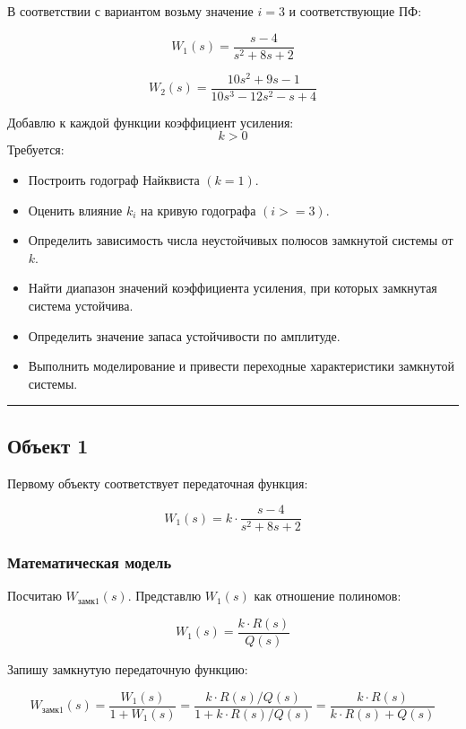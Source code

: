 \documentclass[a4paper,12pt]{article}
\begin{document}
	В соответствии с вариантом возьму значение \(i = 3\) и соответствующие ПФ:
	
	\[W_1(s) = \dfrac{s-4}{s^2 +8s + 2}\]
	
	\[W_2(s) = \dfrac{10s^2 + 9s - 1}{10s^3 - 12s^2 - s + 4}\]
	
	Добавлю к каждой функции коэффициент усиления: \[k > 0\]
		Требуется:
	
	\begin{itemize}
		\item Построить годограф Найквиста \((k = 1)\).
		
		\item Оценить влияние \(k_i\) на кривую годографа \( (i >= 3)\).
		
		\item Определить зависимость числа неустойчивых полюсов замкнутой системы от \(k\).
		
		\item Найти диапазон значений коэффициента усиления, при которых замкнутая система устойчива.
		
		\item Определить значение запаса устойчивости по амплитуде.
		
		\item Выполнить моделирование и привести переходные характеристики замкнутой системы.
	\end{itemize}
	
	
	\hrule
	
	
	
	
	\newpage
	\subsection{Объект 1}
	
	Первому объекту соответствует передаточная функция:
	
	\[W_1(s) = k \cdot \dfrac{s-4}{s^2 +8s + 2}\]
	
	\subsubsection{Математическая модель}
	
	Посчитаю \(W_\text{замк1}(s)\). Представлю \(W_1(s)\) как отношение полиномов:
	
	\[W_1(s) = \frac{k \cdot R(s)}{Q(s)}\]
	
	Запишу замкнутую передаточную функцию:
	
	 \[W_\text{замк1}(s) = \frac{W_1(s)}{1 + W_1(s)} = \frac{k \cdot R(s) / Q(s)}{1 + k \cdot R(s) / Q(s)} = \frac{k \cdot R(s)}{k \cdot R(s) + Q(s)}\]
	 
\end{document}

